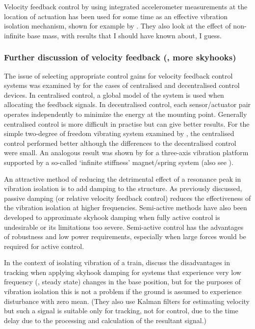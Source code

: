 Velocity feedback control by using integrated accelerometer measurements at the location of actuation has been used for some time as an effective vibration isolation mechanism, shown for example by \textcite{kim1999}.
They also look at the effect of non-infinite base mass, with results that I should have known about, I guess.


\subsubsection{Further discussion of velocity feedback (\ie, more skyhooks)}

The issue of selecting appropriate control gains for velocity feedback control systems was examined by \textcite{engels2008} for the cases of centralised and decentralised control devices.
In centralised control, a global model of the system is used when allocating the feedback signals.
In decentralised control, each sensor/actuator pair operates independently to minimize the energy at the mounting point.
Generally centralised control is more difficult in practise but can give better results.
For the simple two-degree of freedom vibrating system examined by \textcite{engels2008}, the centralised control performed better although the differences to the decentralised control were small.
An analogous result was shown by \textcite{hoque2006} for a three-axis vibration platform supported by a so-called `infinite stiffness' magnet/spring system (also see ).

An attractive method of reducing the detrimental effect of a resonance peak in vibration isolation is to add damping to the structure. As previously discussed, passive damping (or relative velocity feedback control) reduces the effectiveness of the vibration isolation at higher frequencies.
Semi-active methods have also been developed to approximate skyhook damping when fully active control is undesirable \cite{liu2002,liu2005,ahmadian2004} or its limitations too severe.
Semi-active control has the advantages of robustness and low power requirements, especially when large forces would be required for active control.

In the context of isolating vibration of a train, \textcite{li1999} discuss the disadvantages in tracking when applying skyhook damping for systems that experience very low frequency (\ie, steady state) changes in the base position, but for the purposes of vibration isolation this is not a problem if the ground is assumed to experience disturbance with zero mean.
(They also use Kalman filters for estimating velocity but such a signal is suitable only for tracking, not for control, due to the time delay due to the processing and calculation of the resultant signal.)

